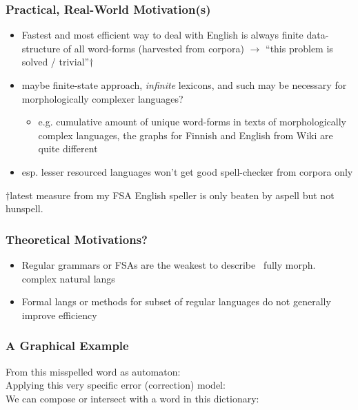 \documentclass[t,12pt]{beamer}
\begin{document}
\begin{frame}
    \frametitle{Practical, Real-World Motivation(s)}
    \begin{itemize}
        \item Fastest and most efficient way to deal with English is always
            finite data-structure of all word-forms (harvested from corpora)
            $\rightarrow$ ``this problem is solved / trivial''$\dagger$
        \item maybe finite-state approach, \emph{infinite} lexicons,
            and such may be necessary for morphologically complexer languages?
            \begin{itemize}
            \item e.g. cumulative amount of unique word-forms in texts of
            morphologically complex languages, the graphs for Finnish and
            English from Wiki are quite different
            \end{itemize}
        \item esp. lesser resourced languages won't get good spell-checker from
            corpora only
    \end{itemize}
    \begin{tiny}$\dagger$latest measure from my FSA English speller is only
    beaten by aspell but not hunspell.\end{tiny}
\end{frame}

\begin{frame}
    \frametitle{Theoretical Motivations?}
    \begin{itemize}
        \item Regular grammars or FSAs are the weakest to describe ~fully
            morph. complex natural langs
        \item Formal langs or methods for subset of regular languages do not
            generally improve efficiency
    \end{itemize}
\end{frame}

\begin{frame}
    \frametitle{A Graphical Example}
    From this misspelled word as automaton:\\
    Applying this very specific error (correction) model:\\
    We can compose or intersect with a word in this dictionary:\\
\end{frame}
\end{document}
